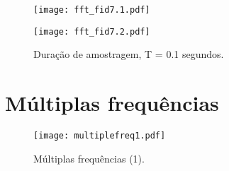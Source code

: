 \begin{figure}[!ht]
    \centering
    \begin{minipage}[b]{0.48\textwidth}
        \centering
        \texttt{[image: fft\_fid7.1.pdf]}
    \end{minipage}
    \hfill
    \begin{minipage}[b]{0.48\textwidth}
        \centering
        \texttt{[image: fft\_fid7.2.pdf]}
    \end{minipage}
    \caption{Duração de amostragem, T = 0.1 segundos.}
\end{figure}

\newpage

\section{Múltiplas frequências}



\begin{figure}[!ht]
\centering
\texttt{[image: multiplefreq1.pdf]}
\caption{Múltiplas frequências (1).}
\end{figure}

